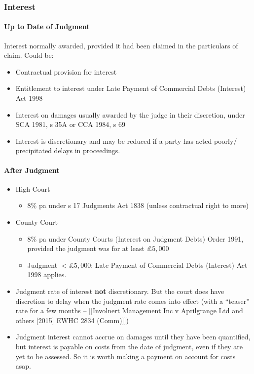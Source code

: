 \documentclass[
]{article}
\providecommand{\tightlist}{%
  \setlength{\itemsep}{0pt}\setlength{\parskip}{0pt}}
\begin{document}
\hypertarget{interest}{%
\subsubsection{Interest}\label{interest}}

\hypertarget{up-to-date-of-judgment}{%
\paragraph{Up to Date of Judgment}\label{up-to-date-of-judgment}}

Interest normally awarded, provided it had been claimed in the
particulars of claim. Could be:

\begin{itemize}
\tightlist
\item
  Contractual provision for interest
\item
  Entitlement to interest under Late Payment of Commercial Debts
  (Interest) Act 1998
\item
  Interest on damages usually awarded by the judge in their discretion,
  under SCA 1981, s 35A or CCA 1984, s 69
\item
  Interest is discretionary and may be reduced if a party has acted
  poorly/ precipitated delays in proceedings.
\end{itemize}

\hypertarget{after-judgment}{%
\paragraph{After Judgment}\label{after-judgment}}

\begin{itemize}
\tightlist
\item
  High Court

  \begin{itemize}
  \tightlist
  \item
    8\% pa under s 17 Judgments Act 1838 (unless contractual right to
    more)
  \end{itemize}
\item
  County Court

  \begin{itemize}
  \tightlist
  \item
    8\% pa under County Courts (Interest on Judgment Debts) Order 1991,
    provided the judgment was for at least \(£5,000\)
  \item
    Judgment \(<£5,000\): Late Payment of Commercial Debts (Interest)
    Act 1998 applies.
  \end{itemize}
\item
  Judgment rate of interest \textbf{not} discretionary. But the court
  does have discretion to delay when the judgment rate comes into effect
  (with a ``teaser'' rate for a few months -- {[}{[}Involnert Management
  Inc v Aprilgrange Ltd and others {[}2015{]} EWHC 2834 (Comm){]}{]})
\item
  Judgment interest cannot accrue on damages until they have been
  quantified, but interest is payable on costs from the date of
  judgment, even if they are yet to be assessed. So it is worth making a
  payment on account for costs asap.
\end{itemize}
\end{document}
